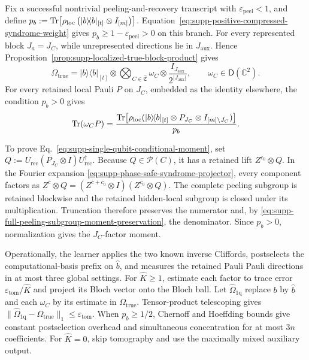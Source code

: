 \documentclass[
  aps,
  prx,
  reprint,
  superscriptaddress,
  amsmath,
  amssymb,
  nofootinbib,
  longbibliography
]{revtex4-2}
\newcommand{\D}{\mathsf{D}}
\begin{document}
Fix a successful nontrivial peeling-and-recovery transcript with
\(\varepsilon_{\mathrm{peel}}<1\), and define
$
p_b:=\Tr\!\left[\rho_{\mathrm{loc}}\left(
|b\rangle\!\langle b|_{[t]}\otimes I_{[m]}\right)\right]
$.
Equation~\eqref{eq:supp-positive-compressed-syndrome-weight} gives
\(p_b\ge1-\varepsilon_{\mathrm{peel}}>0\) on this branch.
For every represented block \(J_a=J_C\), while unrepresented directions
lie in \(J_{\mathrm{aux}}\).  Hence
Proposition~\ref{prop:supp-localized-true-block-product} gives
\begin{equation}
\Omega_{\mathrm{true}}=|b\rangle\!\langle b|_{[t]}\otimes
\bigotimes_{C\in\widehat{\mathfrak C}}\omega_C\otimes
\frac{I_{J_{\mathrm{aux}}}}{2^{|J_{\mathrm{aux}}|}},
\qquad \omega_C\in\D(\mathbb C^2).
\end{equation}
For every retained local Pauli \(P\) on \(J_C\), embedded as the identity elsewhere, the condition \(p_b>0\) gives
\begin{equation}
\Tr(\omega_C P)=\frac{\Tr[\rho_{\mathrm{loc}}(
|b\rangle\!\langle b|_{[t]}\otimes P_{J_C}\otimes I_{[m]\setminus J_C})]}{p_b}.
\label{eq:supp-single-qubit-conditional-moment}
\end{equation}

To prove Eq.~\eqref{eq:supp-single-qubit-conditional-moment}, set
\(Q:=U_{\mathrm{rec}}(P_{J_C}\otimes I)U_{\mathrm{rec}}^\dagger\).
Because \(Q\in\mathcal P(C)\), it has a retained lift
\(Z^{c_0}\otimes Q\).  In the Fourier expansion
\eqref{eq:supp-phase-safe-syndrome-projector}, every component factors as
$Z^c\otimes Q=(Z^{c+c_0}\otimes I)(Z^{c_0}\otimes Q)$.
The complete peeling subgroup is retained blockwise and the retained
hidden-local subgroup is closed under its multiplication.  Truncation
therefore preserves the numerator and, by
\eqref{eq:supp-full-peeling-subgroup-moment-preservation}, the denominator.
Since \(p_b>0\), normalization gives the \(J_C\)-factor moment.

Operationally, the learner applies the two known inverse Cliffords,
postselects the computational-basis prefix on \(\widehat b\), and measures
the retained Pauli Pauli directions in at most three global settings.  For
\(\widehat K\ge1\), estimate each factor to trace error
\(\varepsilon_{\mathrm{tom}}/\widehat K\) and project its Bloch vector onto
the Bloch ball.  Let \(\widehat\Omega_{1\mathrm q}\) replace \(b\) by
\(\widehat b\) and each \(\omega_C\) by its estimate in
\(\Omega_{\mathrm{true}}\).  Tensor-product telescoping gives
$\|\widehat\Omega_{1\mathrm q}-\Omega_{\mathrm{true}}\|_1 \le \varepsilon_{\mathrm{tom}}$.
When $p_b\ge1/2$, Chernoff and Hoeffding bounds give constant postselection
overhead and simultaneous concentration for at most $3n$ coefficients.  For
$\widehat K=0$, skip tomography and use the maximally mixed auxiliary output.
\end{document}
